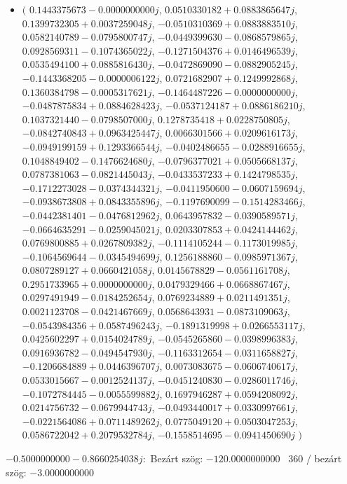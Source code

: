 \documentclass[14pt,a4paper]{article}
\begin{document}
\begin{itemize}
\item
$\big($
$0.1443375673-0.0000000000j$, $0.0510330182+0.0883865647j$, $0.1399732305+0.0037259048j$, $-0.0510310369+0.0883883510j$, $0.0582140789-0.0795800747j$, $-0.0449399630-0.0868579865j$, $0.0928569311-0.1074365022j$, $-0.1271504376+0.0146496539j$, $0.0535494100+0.0885816430j$, $-0.0472869090-0.0882905245j$, $-0.1443368205-0.0000006122j$, $0.0721682907+0.1249992868j$, $0.1360384798-0.0005317621j$, $-0.1464487226-0.0000000000j$, $-0.0487875834+0.0884628423j$, $-0.0537124187+0.0886186210j$, $0.1037321440-0.0798507000j$, $0.1278735418+0.0228750805j$, $-0.0842740843+0.0963425447j$, $0.0066301566+0.0209616173j$, $-0.0949199159+0.1293366544j$, $-0.0402486655-0.0288916655j$, $0.1048849402-0.1476624680j$, $-0.0796377021+0.0505668137j$, $0.0787381063-0.0821445043j$, $-0.0433537233+0.1424798535j$, $-0.1712273028-0.0374344321j$, $-0.0411950600-0.0607159694j$, $-0.0938673808+0.0843355896j$, $-0.1197690099-0.1514283466j$, $-0.0442381401-0.0476812962j$, $0.0643957832-0.0390589571j$, $-0.0664635291-0.0259045021j$, $0.0203307853+0.0424144462j$, $0.0769800885+0.0267809382j$, $-0.1114105244-0.1173019985j$, $-0.1064569644-0.0345494699j$, $0.1256188860-0.0985971367j$, $0.0807289127+0.0660421058j$, $0.0145678829-0.0561161708j$, $0.2951733965+0.0000000000j$, $0.0479329466+0.0668867467j$, $0.0297491949-0.0184252654j$, $0.0769234889+0.0211491351j$, $0.0021123708-0.0421467669j$, $0.0568643931-0.0873109063j$, $-0.0543984356+0.0587496243j$, $-0.1891319998+0.0266553117j$, $0.0425602297+0.0154024789j$, $-0.0545265860-0.0398996383j$, $0.0916936782-0.0494547930j$, $-0.1163312654-0.0311658827j$, $-0.1206684889+0.0446396707j$, $0.0073083675-0.0606740617j$, $0.0533015667-0.0012524137j$, $-0.0451240830-0.0286011746j$, $-0.1072784445-0.0055599882j$, $0.1697946287+0.0594208092j$, $0.0214756732-0.0679944743j$, $-0.0493440017+0.0330997661j$, $-0.0221564086+0.0711489262j$, $0.0775049120+0.0503047253j$, $0.0586722042+0.2079532784j$, $-0.1558514695-0.0941450690j$
$\big)$
\end{itemize}
$-0.5000000000-0.8660254038j$:\
Bezárt szög: $-120.0000000000$ \
360 / bezárt szög: $-3.0000000000$\
\end{document}
